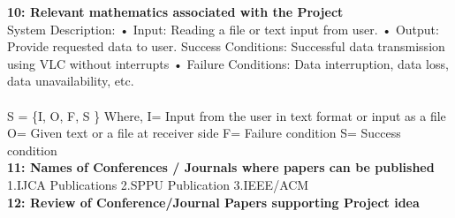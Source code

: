 \documentclass[12pt]{report}	%
\begin{document}
{{{{{{       
{\large\textbf{10: Relevant mathematics associated with the Project}\\
{\small  System Description:
	{\newline •	Input: Reading a file or text input from user.}
	{\newline •	Output: Provide requested  data to  user.}
	{\newline Success Conditions: Successful data transmission using VLC without interrupts}
	{\newline •	Failure Conditions: Data interruption, data loss, data unavailability, etc.}
	\\
	\\
	S = \{I, O, F, S \}
	\newline Where,
	\newline I= Input from the user in text format or input as a file
	\newline O= Given text or a file at receiver side
	\newline F= Failure condition
	\newline S= Success condition}\\



{\large\textbf{11: Names of Conferences / Journals where papers
can be published}\\
{\small  1.IJCA Publications 
\newline 2.SPPU Publication
\newline 3.IEEE/ACM
\newline
      }\\
       
       
{\large\textbf{12: Review of Conference/Journal Papers supporting Project idea}\\

}}}}}}}}}
\end{document}

